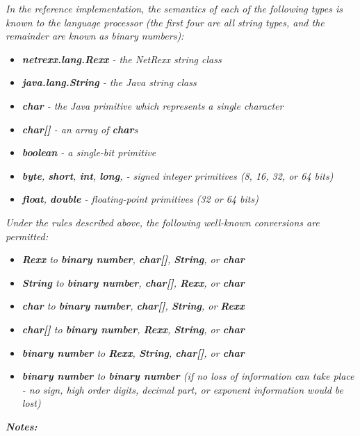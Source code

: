 \emph{In the reference implementation, the semantics of each of the
following types is known to the language processor (the first four are
all \emph{string} types, and the remainder are known as \emph{binary
number}s):}
\begin{itemize}
\item \emph{\textbf{netrexx.lang.Rexx} - the NetRexx string class}
\item \emph{\textbf{java.lang.String} - the Java string class}
\item \emph{\textbf{char} - the Java primitive which represents a single
character}
\item \emph{\textbf{char[]} - an array of
\textbf{char}s}
\item \emph{\textbf{boolean} - a single-bit primitive}
\item \emph{\textbf{byte}, \textbf{short}, \textbf{int}, \textbf{long},
- signed integer primitives (8, 16, 32, or 64 bits)}
\item \emph{\textbf{float}, \textbf{double} - floating-point
primitives (32 or 64 bits)}
\end{itemize}
\emph{Under the rules described above, the following well-known
conversions are permitted:}
\begin{itemize}
\item \emph{\textbf{Rexx} \emph{to} \textbf{binary number}, \textbf{char[]}, \textbf{String},
or \textbf{char}}
\item \emph{\textbf{String} \emph{to} \textbf{binary number}, \textbf{char[]}, \textbf{Rexx},
or \textbf{char}}
\item \emph{\textbf{char} \emph{to} \textbf{binary number}, \textbf{char[]}, \textbf{String},
or \textbf{Rexx}}
\item \emph{\textbf{char[]} \emph{to} \textbf{binary number}, \textbf{Rexx}, \textbf{String},
or \textbf{char}}
\item \emph{\textbf{binary number} \emph{to} \textbf{Rexx}, \textbf{String}, \textbf{char[]},
or \textbf{char}}
\item \emph{\textbf{binary number} \emph{to} \textbf{binary number} (if no loss of
information can take place - no sign, high order digits, decimal
part, or exponent information would be lost)}
\end{itemize}
 \emph{\textbf{Notes:}}
